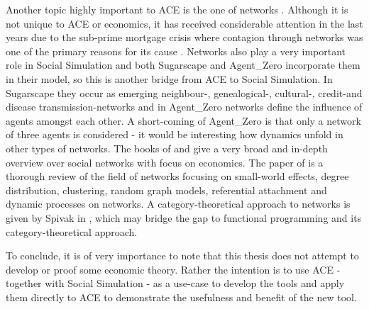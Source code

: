 Another topic highly important to ACE is the one of networks \cite{wilhite_economic_2006}. Although it is not unique to ACE or economics, it has received considerable attention in the last years due to the sub-prime mortgage crisis where contagion through networks was one of the primary reasons for its cause \cite{glasserman_contagion_2015}. Networks also play a very important role in Social Simulation and both Sugarscape \cite{epstein_growing_1996} and Agent\_Zero \cite{epstein_agent_zero:_2014} incorporate them in their model, so this is another bridge from ACE to Social Simulation. In Sugarscape they occur as emerging neighbour-, genealogical-, cultural-, credit-and disease transmission-networks and in Agent\_Zero networks define the influence of agents amongst each other. A short-coming of Agent\_Zero is that only a network of three agents is considered - it would be interesting how dynamics unfold in other types of networks. The books of \cite{jackson_social_2008} and \cite{easley_networks_2010} give a very broad and in-depth overview over social networks with focus on economics. The paper of \cite{newman_structure_2003} is a thorough review of the field of networks focusing on small-world effects, degree distribution, clustering, random graph models, referential attachment and dynamic processes on networks. A category-theoretical approach to networks is given by Spivak in \cite{spivak_higher-dimensional_2009}, which may bridge the gap to functional programming and its category-theoretical approach.

To conclude, it is of very importance to note that this thesis does not attempt to develop or proof some economic theory. Rather the intention is to use ACE  - together with Social Simulation - as a use-case to develop the tools and apply them directly to ACE to demonstrate the usefulness and benefit of the new tool.